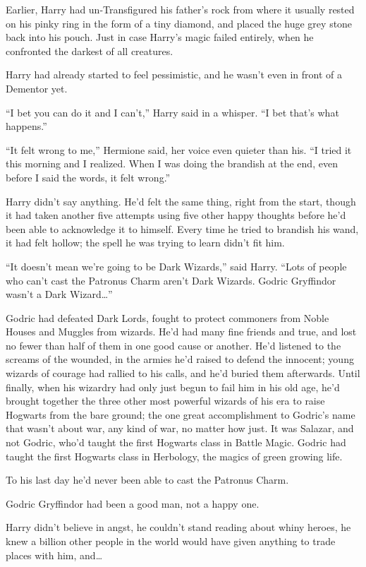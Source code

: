 Earlier, Harry had un-Transfigured his father’s rock from where it usually rested on his pinky ring in the form of a tiny diamond, and placed the huge grey stone back into his pouch. Just in case Harry’s magic failed entirely, when he confronted the darkest of all creatures.

Harry had already started to feel pessimistic, and he wasn’t even in front of a Dementor yet.

“I bet you can do it and I can’t,” Harry said in a whisper. “I bet that’s what happens.”

“It felt wrong to me,” Hermione said, her voice even quieter than his. “I tried it this morning and I realized. When I was doing the brandish at the end, even before I said the words, it felt wrong.”

Harry didn’t say anything. He’d felt the same thing, right from the start, though it had taken another five attempts using five other happy thoughts before he’d been able to acknowledge it to himself. Every time he tried to brandish his wand, it had felt hollow; the spell he was trying to learn didn’t fit him.

“It doesn’t mean we’re going to be Dark Wizards,” said Harry. “Lots of people who can’t cast the Patronus Charm aren’t Dark Wizards. Godric Gryffindor wasn’t a Dark Wizard…”

Godric had defeated Dark Lords, fought to protect commoners from Noble Houses and Muggles from wizards. He’d had many fine friends and true, and lost no fewer than half of them in one good cause or another. He’d listened to the screams of the wounded, in the armies he’d raised to defend the innocent; young wizards of courage had rallied to his calls, and he’d buried them afterwards. Until finally, when his wizardry had only just begun to fail him in his old age, he’d brought together the three other most powerful wizards of his era to raise Hogwarts from the bare ground; the one great accomplishment to Godric’s name that wasn’t about war, any kind of war, no matter how just. It was Salazar, and not Godric, who’d taught the first Hogwarts class in Battle Magic. Godric had taught the first Hogwarts class in Herbology, the magics of green growing life.

To his last day he’d never been able to cast the Patronus Charm.

Godric Gryffindor had been a good man, not a happy one.

Harry didn’t believe in angst, he couldn’t stand reading about whiny heroes, he knew a billion other people in the world would have given anything to trade places with him, and…

